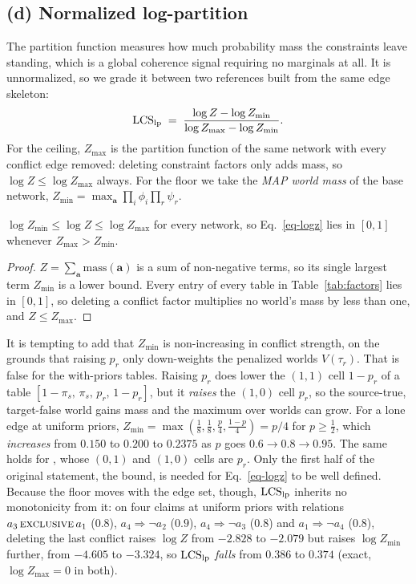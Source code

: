 \subsection{(d) Normalized log-partition}
\label{sec-logz}

The partition function measures how much probability mass the constraints leave standing, which is a
global coherence signal requiring no marginals at all. It is unnormalized, so we grade it between two
references built from the same edge skeleton:
\begin{equation}
\mathrm{LCS}_{\mathrm{lp}} \;=\; \frac{\log Z - \log Z_{\min}}{\log Z_{\max} - \log Z_{\min}} .
\label{eq-logz}
\end{equation}
For the ceiling, $Z_{\max}$ is the partition function of the same network with every conflict edge
removed: deleting constraint factors only adds mass, so $\log Z\le\log Z_{\max}$ always. For the
floor we take the \emph{MAP world mass} of the base network,
$Z_{\min}=\max_{\mathbf{a}}\prod_i\phi_i\prod_r\psi_r$.

\begin{lemma}
\label{lem-floor}
$\log Z_{\min}\le\log Z\le\log Z_{\max}$ for every network, so Eq.~\ref{eq-logz} lies in $[0,1]$
whenever $Z_{\max}>Z_{\min}$.
\end{lemma}
\begin{proof}
$Z=\sum_{\mathbf{a}}\mathrm{mass}(\mathbf{a})$ is a sum of non-negative terms, so its single largest
term $Z_{\min}$ is a lower bound. Every entry of every table in Table~\ref{tab:factors} lies in
$[0,1]$, so deleting a conflict factor multiplies no world's mass by less than one, and
$Z\le Z_{\max}$.
\end{proof}

\begin{remark}
\label{rem-floor}
It is tempting to add that $Z_{\min}$ is non-increasing in conflict strength, on the grounds that
raising $p_r$ only down-weights the penalized worlds $V(\tau_r)$. That is false for the with-priors
tables. Raising $p_r$ does lower the $(1,1)$ cell $1-p_r$ of a \con{} table
$[1-\pi_s,\,\pi_s,\,p_r,\,1-p_r]$, but it \emph{raises} the $(1,0)$ cell $p_r$, so the
source-true, target-false world gains mass and the maximum over worlds can grow. For a lone \con{}
edge at uniform priors, $Z_{\min}=\max(\tfrac18,\tfrac18,\tfrac{p}{4},\tfrac{1-p}{4})=p/4$ for
$p\ge\tfrac12$, which \emph{increases} from $0.150$ to $0.200$ to $0.2375$ as $p$ goes
$0.6\to0.8\to0.95$. The same holds for \exc{}, whose $(0,1)$ and $(1,0)$ cells are $p_r$. Only the
first half of the original statement, the bound, is needed for Eq.~\ref{eq-logz} to be well
defined. Because the floor moves with the edge set, though, $\mathrm{LCS}_{\mathrm{lp}}$ inherits no monotonicity
from it: on four claims at uniform priors with relations $a_3\,\textsc{exclusive}\,a_1$ ($0.8$),
$a_4\Rightarrow\neg a_2$ ($0.9$), $a_4\Rightarrow\neg a_3$ ($0.8$) and $a_1\Rightarrow\neg a_4$
($0.8$), deleting the last conflict raises $\log Z$ from $-2.828$ to $-2.079$ but raises
$\log Z_{\min}$ further, from $-4.605$ to $-3.324$, so $\mathrm{LCS}_{\mathrm{lp}}$ \emph{falls} from $0.386$ to
$0.374$ (exact, $\log Z_{\max}=0$ in both).
\end{remark}

